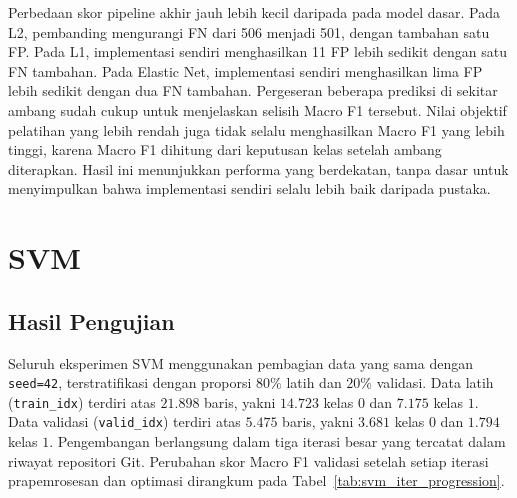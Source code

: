 Perbedaan skor pipeline akhir jauh lebih kecil daripada pada model dasar. Pada L2, pembanding mengurangi FN dari 506 menjadi 501, dengan tambahan satu FP. Pada L1, implementasi sendiri menghasilkan 11 FP lebih sedikit dengan satu FN tambahan. Pada Elastic Net, implementasi sendiri menghasilkan lima FP lebih sedikit dengan dua FN tambahan. Pergeseran beberapa prediksi di sekitar ambang sudah cukup untuk menjelaskan selisih Macro F1 tersebut. Nilai objektif pelatihan yang lebih rendah juga tidak selalu menghasilkan Macro F1 yang lebih tinggi, karena Macro F1 dihitung dari keputusan kelas setelah ambang diterapkan. Hasil ini menunjukkan performa yang berdekatan, tanpa dasar untuk menyimpulkan bahwa implementasi sendiri selalu lebih baik daripada pustaka.

\section{SVM}

\subsection{Hasil Pengujian}

Seluruh eksperimen SVM menggunakan pembagian data yang sama dengan \texttt{seed=42}, terstratifikasi dengan proporsi $80\%$ latih dan $20\%$ validasi. Data latih (\texttt{train\_idx}) terdiri atas $21.898$ baris, yakni $14.723$ kelas $0$ dan $7.175$ kelas $1$. Data validasi (\texttt{valid\_idx}) terdiri atas $5.475$ baris, yakni $3.681$ kelas $0$ dan $1.794$ kelas $1$. Pengembangan berlangsung dalam tiga iterasi besar yang tercatat dalam riwayat repositori Git. Perubahan skor Macro F1 validasi setelah setiap iterasi prapemrosesan dan optimasi dirangkum pada Tabel~\ref{tab:svm_iter_progression}.

